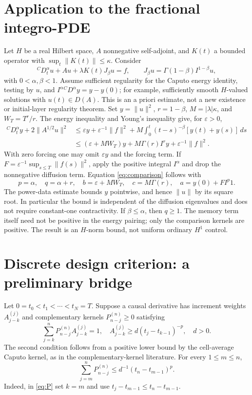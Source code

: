 \documentclass[11pt,a4paper]{article}
\newcommand{\norm}[1]{\lVert#1\rVert}
\begin{document}
\section{Application to the fractional integro-PDE}
Let $H$ be a real Hilbert space, $A$ nonnegative self-adjoint, and $K(t)$ a bounded operator with $\sup_t\norm{K(t)}\le\kappa$. Consider
\[
 {}^CD_t^\alpha u+Au+\lambda K(t)J_\beta u=f,\qquad
 J_\beta u=\Gamma(1-\beta)I^{1-\beta}u,
\]
with $0<\alpha,\beta<1$. Assume sufficient regularity for the Caputo energy identity, testing by $u$, and $I^\alpha{}^CD^\alpha y=y-y(0)$; for example, sufficiently smooth $H$-valued solutions with $u(t)\in D(A)$. This is an a priori estimate, not a new existence or initial-layer regularity theorem.
Set $y=\norm u^2$, $r=1-\beta$, $M=|\lambda|\kappa$, and $W_T=T^r/r$. The energy inequality and Young's inequality give, for $\varepsilon>0$,
\begin{align*}
 {}^CD_t^\alpha y+2\norm{A^{1/2}u}^2
 &\le \varepsilon y+\varepsilon^{-1}\norm f^2
       +M\int_0^t(t-s)^{-\beta}[y(t)+y(s)]\,ds\\
 &\le (\varepsilon+MW_T)y+M\Gamma(r)I^r y+\varepsilon^{-1}\norm f^2.
\end{align*}
With zero forcing one may omit $\varepsilon y$ and the forcing term. If $F=\varepsilon^{-1}\sup_{s\le T}\norm{f(s)}^2$, apply the positive integral $I^\alpha$ and drop the nonnegative diffusion term. Equation \eqref{eq:comparison} follows with
\[
 p=\alpha,\quad q=\alpha+r,\quad b=\varepsilon+MW_T,\quad c=M\Gamma(r),\quad a=y(0)+FI^p1.
\]
The power-data estimate bounds $y$ pointwise, and hence $\norm{u}$ by its square root. In particular the bound is independent of the diffusion eigenvalues and does not require constant-one contractivity. If $\beta\le\alpha$, then $q\ge1$. The memory term itself need not be positive in the energy pairing; only the comparison kernels are positive. The result is an $H$-norm bound, not uniform ordinary $H^1$ control.
\section{Discrete design criterion: a preliminary bridge}
Let $0=t_0<t_1<\cdots<t_N=T$. Suppose a causal derivative has increment weights $A_{j-k}^{(j)}$ and complementary kernels $P_{n-j}^{(n)}\ge0$ satisfying
\begin{equation}
 \sum_{j=k}^n P_{n-j}^{(n)}A_{j-k}^{(j)}=1,
 \quad A_{j-k}^{(j)}\ge d(t_j-t_{k-1})^{-p},\quad d>0.\label{eq:P}
\end{equation}
The second condition follows from a positive lower bound by the cell-average Caputo kernel, as in the complementary-kernel literature. For every $1\le m\le n$,
\begin{equation}\sum_{j=m}^n P_{n-j}^{(n)}\le d^{-1}(t_n-t_{m-1})^p.\label{eq:tailP}\end{equation}
Indeed, in \eqref{eq:P} set $k=m$ and use $t_j-t_{m-1}\le t_n-t_{m-1}$.
\end{document}
